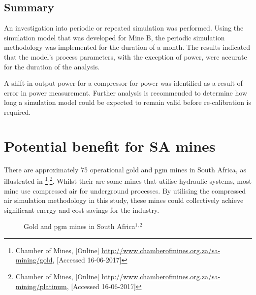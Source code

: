 	\subsection{Summary}
	An investigation into periodic or repeated simulation was performed. Using the simulation model that was developed for Mine B, the periodic simulation methodology was implemented for the duration of a month. The results indicated that the model's process parameters, with the exception of power,  were accurate for the duration of the analysis.
	\par 
	 A shift in output power for a compressor for power was identified as a result of error in power measurement. Further analysis is recommended to determine how long a simulation model could be expected to remain valid before re-calibration is required.
\section{Potential benefit for SA mines}
There are approximately 75 operational gold and \gls{pgm} mines in South Africa, as illustrated in  \footnote{ Chamber of Mines, [Online] \url{http://www.chamberofmines.org.za/sa-mining/gold}, [Accessed 16-06-2017]}$^,$\footnote{ Chamber of Mines, [Online] \url{http://www.chamberofmines.org.za/sa-mining/platinum}, [Accessed 16-06-2017]}. Whilst their are some mines that utilise hydraulic systems, most mine use compressed air for underground processes. By utilising the compressed air simulation methodology in this study, these mines could collectively achieve significant energy and cost savings for the industry. 
\par 
	\begin{figure}[h!]
		\centering
		\caption[Gold and Platinum group metal mines in South Africa]{Gold and \gls{pgm} mines in South Africa$^{1,2}$}
		\label{fig: Mine map}
	\end{figure}
